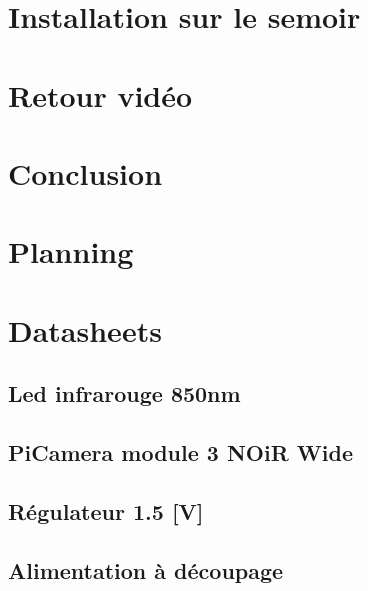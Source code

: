 \documentclass[
    iai, %
    eai, %
]{heig-tb}
\begin{document}
\chapter{Installation sur le semoir}


\chapter{Retour vidéo}


\chapter{Conclusion}


\clearpage
\printbibliography

\appendix
\appendixpage
\addappheadtotoc

\chapter{Planning \label{planning}}

\chapter{Datasheets}
\section{Led infrarouge 850nm}

\section{PiCamera module 3 NOiR Wide}


\section{Régulateur 1.5 [V]}


\section{Alimentation à découpage}

\end{document}
